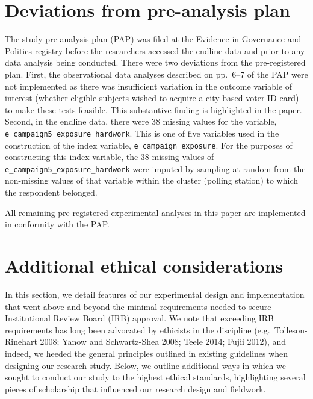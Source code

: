 \documentclass[
  11.5pt,
]{article}
\begin{document}
\hypertarget{deviations-from-pre-analysis-plan}{%
\section{Deviations from pre-analysis
plan}\label{deviations-from-pre-analysis-plan}}

The study pre-analysis plan (PAP) was filed at the Evidence in
Governance and Politics registry before the researchers accessed the
endline data and prior to any data analysis being conducted. There were
two deviations from the pre-registered plan. First, the observational
data analyses described on pp.~6--7 of the PAP were not implemented as
there was insufficient variation in the outcome variable of interest
(whether eligible subjects wished to acquire a city-based voter ID card)
to make these tests feasible. This substantive finding is highlighted in
the paper. Second, in the endline data, there were 38 missing values for
the variable, \texttt{e\_campaign5\_exposure\_hardwork}. This is one of
five variables used in the construction of the index variable,
\texttt{e\_campaign\_exposure}. For the purposes of constructing this
index variable, the 38 missing values of
\texttt{e\_campaign5\_exposure\_hardwork} were imputed by sampling at
random from the non-missing values of that variable within the cluster
(polling station) to which the respondent belonged.

All remaining pre-registered experimental analyses in this paper are
implemented in conformity with the PAP.

\hypertarget{additional-ethical-considerations}{%
\section{Additional ethical
considerations}\label{additional-ethical-considerations}}

In this section, we detail features of our experimental design and
implementation that went above and beyond the minimal requirements
needed to secure Institutional Review Board (IRB) approval. We note that
exceeding IRB requirements has long been advocated by ethicists in the
discipline (e.g.~Tolleson-Rinehart 2008; Yanow and Schwartz-Shea 2008;
Teele 2014; Fujii 2012), and indeed, we heeded the general principles
outlined in existing guidelines when designing our research study.
Below, we outline additional ways in which we sought to conduct our
study to the highest ethical standards, highlighting several pieces of
scholarship that influenced our research design and fieldwork.
\end{document}
